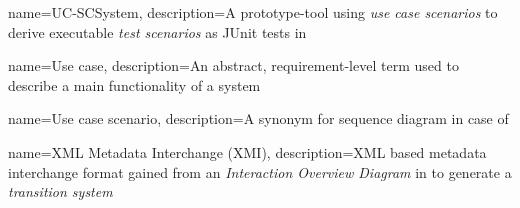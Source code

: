 {
	name={UC-SCSystem},
	description={A prototype-tool using \textit{use case scenarios} to derive executable \textit{test scenarios} as JUnit tests in \cite{ClementineNebut2006}}
}

{
	name={Use case},
	description={An abstract, requirement-level term used to describe a main functionality of a system}
}

{
	name={Use case scenario},
	description={A synonym for sequence diagram in case of \cite{ClementineNebut2006}}
}

{
	name={XML Metadata Interchange (XMI)},
	description={XML based metadata interchange format gained from an \textit{Interaction Overview Diagram} in \cite{NajlaRaza2007} to generate a \textit{transition system}}
}

